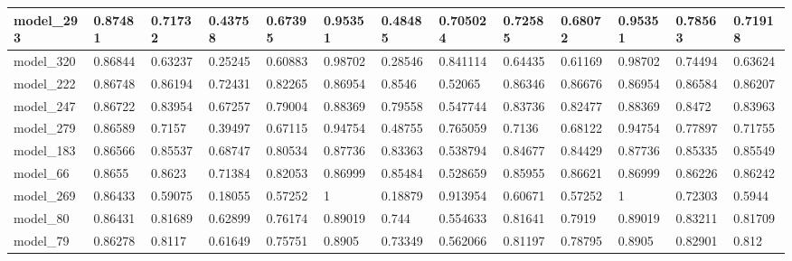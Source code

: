 \begin{tabular}{|l|l|l|l|l|l|l|l|l|l|l|l|l|}
model\_293     & 0.87481     & 0.71732        & 0.43758      & 0.67395          & 0.95351              & 0.48485              & 0.705024     & 0.72585           & 0.68072            & 0.95351         & 0.78563     & 0.71918      \\ \hline
model\_320     & 0.86844     & 0.63237        & 0.25245      & 0.60883          & 0.98702              & 0.28546              & 0.841114     & 0.64435           & 0.61169            & 0.98702         & 0.74494     & 0.63624      \\ \hline
model\_222     & 0.86748     & 0.86194        & 0.72431      & 0.82265          & 0.86954              & 0.8546               & 0.52065      & 0.86346           & 0.86676            & 0.86954         & 0.86584     & 0.86207      \\ \hline
model\_247     & 0.86722     & 0.83954        & 0.67257      & 0.79004          & 0.88369              & 0.79558              & 0.547744     & 0.83736           & 0.82477            & 0.88369         & 0.8472      & 0.83963      \\ \hline
model\_279     & 0.86589     & 0.7157         & 0.39497      & 0.67115          & 0.94754              & 0.48755              & 0.765059     & 0.7136            & 0.68122            & 0.94754         & 0.77897     & 0.71755      \\ \hline
model\_183     & 0.86566     & 0.85537        & 0.68747      & 0.80534          & 0.87736              & 0.83363              & 0.538794     & 0.84677           & 0.84429            & 0.87736         & 0.85335     & 0.85549      \\ \hline
model\_66      & 0.8655      & 0.8623         & 0.71384      & 0.82053          & 0.86999              & 0.85484              & 0.528659     & 0.85955           & 0.86621            & 0.86999         & 0.86226     & 0.86242      \\ \hline
model\_269     & 0.86433     & 0.59075        & 0.18055      & 0.57252          & 1                    & 0.18879              & 0.913954     & 0.60671           & 0.57252            & 1               & 0.72303     & 0.5944       \\ \hline
model\_80      & 0.86431     & 0.81689        & 0.62899      & 0.76174          & 0.89019              & 0.744                & 0.554633     & 0.81641           & 0.7919             & 0.89019         & 0.83211     & 0.81709      \\ \hline
model\_79      & 0.86278     & 0.8117         & 0.61649      & 0.75751          & 0.8905               & 0.73349              & 0.562066     & 0.81197           & 0.78795            & 0.8905          & 0.82901     & 0.812        \\ \hline

\end{tabular}
